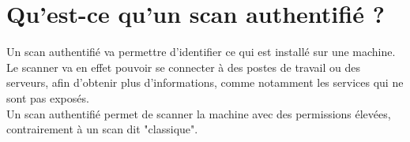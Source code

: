 \section{Qu’est-ce qu’un scan authentifié ?}
Un scan authentifié va permettre d'identifier ce qui est installé sur une machine. Le scanner va en effet pouvoir se connecter à des postes de travail ou des serveurs, afin d'obtenir plus d'informations, comme notamment les services qui ne sont pas exposés. \\ 
\indent Un scan authentifié permet de scanner la machine avec des permissions élevées, contrairement à un scan dit "classique".